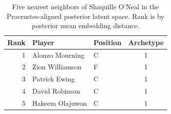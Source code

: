 \begin{table}[htbp]
  \centering\small
  \begin{tabular}{rllc}
    \toprule
    Rank & Player & Position & Archetype \\
    \midrule
    1 & Alonzo Mourning & C & 1 \\
    2 & Zion Williamson & F & 1 \\
    3 & Patrick Ewing & C & 1 \\
    4 & David Robinson & C & 1 \\
    5 & Hakeem Olajuwon & C & 1 \\
    \bottomrule
  \end{tabular}
  \caption{Five nearest neighbors of Shaquille O'Neal in the Procrustes-aligned posterior latent space. Rank is by posterior mean embedding distance.}
  \label{tab:Shaquille_O_Neal_neighbors}
\end{table}

